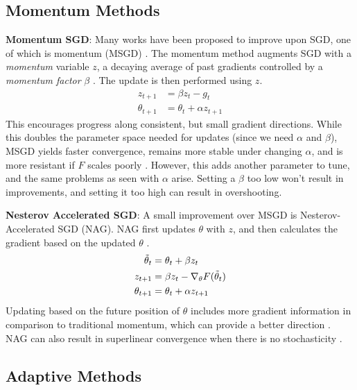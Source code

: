 \subsection{Momentum Methods} \label{sec:momentum}
\textbf{Momentum SGD}: Many works have been proposed to improve upon SGD, one of which is momentum (MSGD) \citep{polyak1964some}. The momentum method augments SGD with a \textit{momentum} variable $z$, a decaying average of past gradients controlled by a \textit{momentum factor} $\beta$ \citep{polyak1964some, henriques2019small}. The update is then performed using $z$. 
\begin{align}
    z_{t+1} &= \beta z_{t} - g_t \\
    \theta_{t+1} &= \theta_t + \alpha z_{t+1}
\end{align}
This encourages progress along consistent, but small gradient directions. While this doubles the parameter space needed for updates (since we need $\alpha$ and $\beta$), MSGD yields faster convergence, remains more stable under changing $\alpha$, and is more resistant if $F$ scales poorly \citep{polyak1964some,henriques2019small}. However, this adds another parameter to tune, and the same problems as seen with $\alpha$ arise. Setting a $\beta$ too low won't result in improvements, and setting it too high can result in overshooting.

\textbf{Nesterov Accelerated SGD}: A small improvement over MSGD is Nesterov-Accelerated SGD (NAG). NAG first updates $\theta$ with $z$, and then calculates the gradient based on the updated $\theta$ \citep{nesterov1983method}.
\begin{align}
    \Tilde{\theta}_{t} &= \theta_{t} + \beta z_{t} \\
    z_{t+1} &= \beta z_t - \nabla_{\theta} F(\Tilde{\theta}_{t}) \\
    \theta_{t+1} &= \theta_{t} + \alpha z_{t+1}
\end{align}
Updating based on the future position of $\theta$ includes more gradient information in comparison to traditional momentum, which can provide a better direction \citep{nesterov1983method, dozat2016nadam}. NAG can also result in superlinear convergence when there is no stochasticity \citep{nesterov1983method}.

\subsection{Adaptive Methods}

